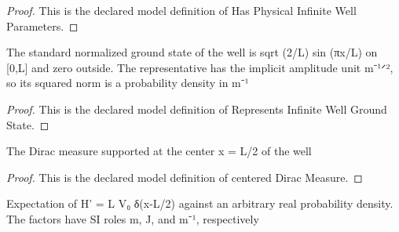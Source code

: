 \begin{proof}
  This is the declared model definition of Has Physical Infinite Well Parameters.
\end{proof}
\begin{definition}
  \label{def:physics:phyx-mini-0546:phyxminiproblems-problemphyxmini0546-representsinfinitewellgroundstate}
  The standard normalized ground state of the well is sqrt (2/L) sin (πx/L) on [0,L] and zero outside. The representative has the implicit amplitude unit m⁻¹ᐟ², so its squared norm is a probability density in m⁻¹
\end{definition}
\begin{proof}
  This is the declared model definition of Represents Infinite Well Ground State.
\end{proof}
\begin{definition}
  \label{def:physics:phyx-mini-0546:phyxminiproblems-problemphyxmini0546-centereddiracmeasure}
  The Dirac measure supported at the center x = L/2 of the well
\end{definition}
\begin{proof}
  This is the declared model definition of centered Dirac Measure.
\end{proof}
\begin{definition}
  \label{def:physics:phyx-mini-0546:phyxminiproblems-problemphyxmini0546-centereddiracexpectationinjoules}
  Expectation of H' = L V₀ δ(x-L/2) against an arbitrary real probability density. The factors have SI roles m, J, and m⁻¹, respectively
\end{definition}
